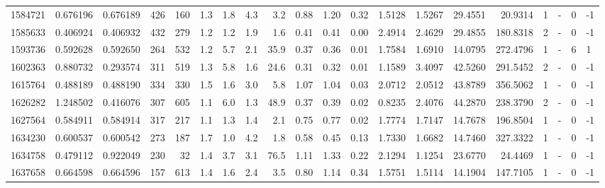 \begin{tabular}{rrrrrrrrrrrrrrrrrlrl}
   1584721 & 0.676196 &   0.676189 &  426 &  160 &      1.3 &      1.8 &     4.3 &      3.2 &       0.88 &        1.20 &        0.32 &  1.5128 &  1.5267 &   29.4551 &   20.9314 &       1 &             - &        0 &        -1 \\
   1585633 & 0.406924 &   0.406932 &  432 &  279 &      1.2 &      1.2 &     1.9 &      1.6 &       0.41 &        0.41 &        0.00 &  2.4914 &  2.4629 &   29.4855 &  180.8318 &       2 &             - &        0 &        -1 \\
   1593736 & 0.592628 &   0.592650 &  264 &  532 &      1.2 &      5.7 &     2.1 &     35.9 &       0.37 &        0.36 &        0.01 &  1.7584 &  1.6910 &   14.0795 &  272.4796 &       1 &             - &        6 &         1 \\
   1602363 & 0.880732 &   0.293574 &  311 &  519 &      1.3 &      5.8 &     1.6 &     24.6 &       0.31 &        0.32 &        0.01 &  1.1589 &  3.4097 &   42.5260 &  291.5452 &       2 &             - &        0 &        -1 \\
   1615764 & 0.488189 &   0.488190 &  334 &  330 &      1.5 &      1.6 &     3.0 &      5.8 &       1.07 &        1.04 &        0.03 &  2.0712 &  2.0512 &   43.8789 &  356.5062 &       1 &             - &        0 &        -1 \\
   1626282 & 1.248502 &   0.416076 &  307 &  605 &      1.1 &      6.0 &     1.3 &     48.9 &       0.37 &        0.39 &        0.02 &  0.8235 &  2.4076 &   44.2870 &  238.3790 &       2 &             - &        0 &        -1 \\
   1627564 & 0.584911 &   0.584914 &  317 &  217 &      1.1 &      1.3 &     1.4 &      2.1 &       0.75 &        0.77 &        0.02 &  1.7774 &  1.7147 &   14.7678 &  196.8504 &       1 &             - &        0 &        -1 \\
   1634230 & 0.600537 &   0.600542 &  273 &  187 &      1.7 &      1.0 &     4.2 &      1.8 &       0.58 &        0.45 &        0.13 &  1.7330 &  1.6682 &   14.7460 &  327.3322 &       1 &             - &        0 &        -1 \\
   1634758 & 0.479112 &   0.922049 &  230 &   32 &      1.4 &      3.7 &     3.1 &     76.5 &       1.11 &        1.33 &        0.22 &  2.1294 &  1.1254 &   23.6770 &   24.4469 &       1 &             - &        0 &        -1 \\
   1637658 & 0.664598 &   0.664596 &  157 &  613 &      1.4 &      1.6 &     2.4 &      3.5 &       0.80 &        1.14 &        0.34 &  1.5751 &  1.5114 &   14.1904 &  147.7105 &       1 &             - &        0 &        -1 \\

\end{tabular}
